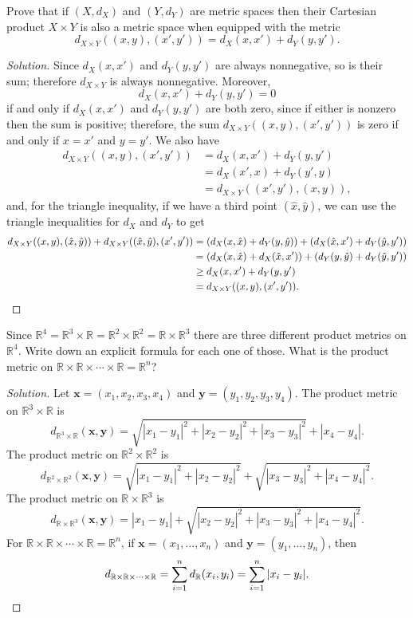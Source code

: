 \documentclass[11pt]{scrartcl}
\providecommand{\RR}{\mathbb R}
\theoremstyle{problem}
\newenvironment{problem}[1]
{\renewcommand\theinnercustomthm{#1}\innercustomthm}
{\endinnercustomthm}
\theoremstyle{remark}
\newenvironment{soln}{\begin{proof}[Solution]}{\end{proof}}
\begin{document}
\begin{problem}{6}
	Prove that if $(X, d_X)$ and $(Y, d_Y)$ are metric spaces
	then their Cartesian product $X\times Y$ is also a metric space
	when equipped with the metric
	\[d_{X\times Y} ((x, y), (x', y')) = d_X(x, x') + d_Y(y, y').\]
\end{problem}

\begin{soln}
	Since $d_X(x, x')$ and $d_Y(y, y')$ are always nonnegative,
	so is their sum; therefore $d_{X\times Y}$ is always nonnegative.
	Moreover,
	\[d_X(x, x') + d_Y(y, y') = 0\]
	if and only if $d_X(x, x')$ and $d_Y(y, y')$ are both zero,
	since if either is nonzero then the sum is positive;
	therefore, the sum $d_{X\times Y}((x, y), (x', y'))$ is zero
	if and only if $x = x'$ and $y = y'$.
	We also have
	\begin{align*}
		d_{X\times Y}((x, y), (x', y')) &=
		d_X(x, x') + d_Y(y, y')\\
		&= d_X(x', x) + d_Y(y', y)\\
		&= d_{X\times Y}((x', y'), (x, y)),
	\end{align*}
	and, for the triangle inequality,
	if we have a third point $(\hat x, \hat y)$, we can use the
	triangle inequalities for $d_X$ and $d_Y$ to get
	\begin{align*}
		d_{X\times Y}((x, y), (\hat x, \hat y)) +
		d_{X\times Y}((\hat x, \hat y), (x', y'))
		&= (d_X(x, \hat x) + d_Y(y, \hat y)) +
		(d_X(\hat x, x') + d_Y(\hat y, y'))\\
		&= (d_X(x, \hat x) + d_X(\hat x, x')) +
		(d_Y(y, \hat y) + d_Y(\hat y, y'))\\
		&\ge d_X(x, x') + d_Y(y, y')\\
		&= d_{X\times Y}((x, y), (x', y')).\qedhere
	\end{align*}
\end{soln}

\begin{problem}{7}
	Since $\RR^4 = \RR^3\times \RR = \RR^2\times\RR^2 = \RR\times\RR^3$
	there are three different product metrics on $\RR^4$.
	Write down an explicit formula for each one of those.
	What is the product metric on $\RR\times\RR\times\cdots\times\RR=\RR^n$?
\end{problem}

\begin{soln}
	Let $\mathbf x = (x_1, x_2, x_3, x_4)$ and
	$\mathbf y = (y_1, y_2, y_3, y_4)$.
	The product metric on $\RR^3\times\RR$ is
	\[d_{\RR^3\times\RR}(\mathbf x,\mathbf y) =
	\sqrt{|x_1 - y_1|^2 + |x_2 - y_2|^2 + |x_3 - y_3|^2}
	+ |x_4 - y_4|.\]
	The product metric on $\RR^2\times\RR^2$ is
	\[d_{\RR^2\times\RR^2}(\mathbf x,\mathbf y) =
	\sqrt{|x_1 - y_1|^2 + |x_2 - y_2|^2}
	+ \sqrt{|x_3 - y_3|^2 + |x_4 - y_4|^2}.\]
	The product metric on $\RR\times\RR^3$ is
	\[d_{\RR\times\RR^3}(\mathbf x,\mathbf y) =
	|x_1 - y_1| + \sqrt{|x_2 - y_2|^2 + |x_3 - y_3|^2 + |x_4 - y_4|^2}.\]
	For $\RR\times\RR\times\cdots\times\RR = \RR^n$,
	if $\mathbf x = (x_1, \dots, x_n)$ and $\mathbf y = (y_1, \dots, y_n)$, then
	\[d_{\RR\times\RR\times\cdots\times\RR} = \sum_{i=1}^n d_\RR(x_i, y_i)
	= \sum_{i=1}^n |x_i - y_i|.\qedhere\]
\end{soln}
\end{document}
